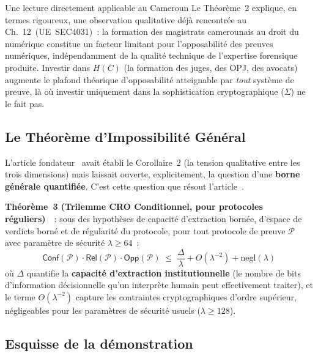 \begin{boiteRemarque}{Une lecture directement applicable au Cameroun}
Le Théorème~2 explique, en termes rigoureux, une observation
qualitative déjà rencontrée au Ch.~12~(UE~SEC4031)~: la
formation des magistrats camerounais au droit du numérique
constitue un facteur limitant pour l'opposabilité des preuves
numériques, indépendamment de la qualité technique de l'expertise
forensique produite. Investir dans $H(C)$ (la formation des juges,
des OPJ, des avocats) augmente le plafond théorique d'opposabilité
atteignable par \emph{tout} système de preuve, là où investir
uniquement dans la sophistication cryptographique ($\Sigma$) ne le
fait pas.
\end{boiteRemarque}

\subsection{Le Théorème d'Impossibilité Général}

L'article fondateur~\cite{minka2026clo} avait établi le Corollaire~2
(la tension qualitative entre les trois dimensions) mais laissait
ouverte, explicitement, la question d'une \textbf{borne générale
quantifiée}. C'est cette question que résout
l'article~\cite{minka2026conditional}.

\begin{boxjuris}
\textbf{Théorème~3 (Trilemme CRO Conditionnel, pour protocoles
réguliers)}~\cite{minka2026conditional}~: sous des hypothèses de
capacité d'extraction bornée, d'espace de verdicts borné et de
régularité du protocole, pour tout protocole de preuve $\mathcal{P}$
avec paramètre de sécurité $\lambda \geq 64$~:
\begin{equation}
\mathsf{Conf}(\mathcal{P}) \cdot \mathsf{Rel}(\mathcal{P}) \cdot
\mathsf{Opp}(\mathcal{P}) \;\leq\; \frac{\Delta}{\lambda} +
O(\lambda^{-2}) + \mathrm{negl}(\lambda)
\label{thm:trilemma-general}
\end{equation}
où $\Delta$ quantifie la \textbf{capacité d'extraction
institutionnelle} (le nombre de bits d'information décisionnelle
qu'un interprète humain peut effectivement traiter), et le terme
$O(\lambda^{-2})$ capture les contraintes cryptographiques d'ordre
supérieur, négligeables pour les paramètres de sécurité usuels
($\lambda \geq 128$).
\end{boxjuris}

\subsection{Esquisse de la démonstration}

